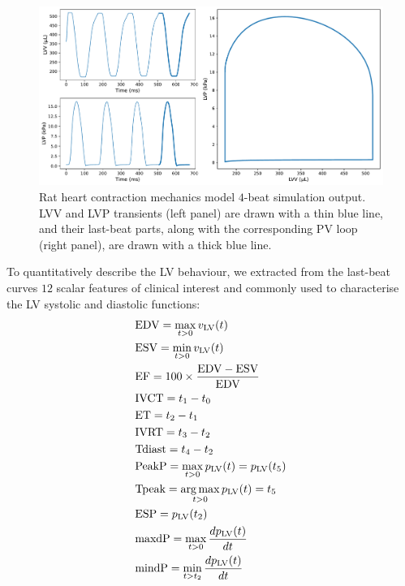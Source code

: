 \begin{figure}[!ht]
    \myfloatalign
    \includegraphics[width=\textwidth]{figures/chapter03/a_typical_model_output.pdf}
    \caption{Rat heart contraction mechanics model $4$-beat simulation output. LVV and LVP transients (left panel) are drawn with a thin blue line, and their last-beat parts, along with the corresponding PV loop (right panel), are drawn with a thick blue line.}
    \label{fig:examplepvloop}
\end{figure}

\vspace{0.2cm}
To quantitatively describe the LV behaviour, we extracted from the last-beat curves $12$ scalar features of clinical interest and commonly used to characterise the LV systolic and diastolic functions:
%
\begin{align}
    &\text{EDV}= \max_{t>0}{v_{\textrm{LV}}(t)} \\
    &\text{ESV}= \min_{t>0}{v_{\textrm{LV}}(t)} \\
    &\text{EF}= 100\times\frac{\text{EDV}-\text{ESV}}{\text{EDV}} \\
    &\text{IVCT}= t_1-t_0 \\
    &\text{ET}= t_2-t_1 \\
    &\text{IVRT}= t_3-t_2 \\
    &\text{Tdiast}= t_4-t_2 \\
    &\text{PeakP}= \max_{t>0}{p_{\textrm{LV}}(t)} = p_{\textrm{LV}}(t_5) \\
    &\text{Tpeak}= \operatorname*{arg\,max}_{t>0}{p_{\textrm{LV}}(t)} = t_5 \\
    &\text{ESP}= p_{\textrm{LV}}(t_2) \\
    &\text{maxdP}= \max_{t>0}{\frac{dp_{\textrm{LV}}(t)}{dt}} \\
    &\text{mindP}= \min_{t>t_2}{\frac{dp_{\textrm{LV}}(t)}{dt}}
\end{align}


